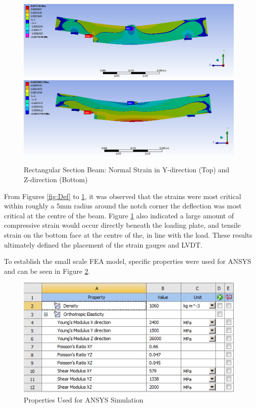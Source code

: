 \documentclass[11pt,a4paper]{article}
\numberwithin{equation}{subsection}
\begin{document}
\begin{figure}[h]
	\begin{center}
		\includegraphics[scale=0.45]{y_normal_strain}
		\includegraphics[scale=0.45]{z_normal_strain}
	\end{center}
	\caption{Rectangular Section Beam: Normal Strain in Y-direction (Top) and Z-direction (Bottom)}
	\label{fig:fig:y_norm}
\end{figure}

\noindent
From Figures \ref{fig:Def} to \ref{fig:fig:y_norm}, it was observed that the strains were most critical within roughly a 5mm radius around the notch corner the deflection was most critical at the centre of the beam. Figure \ref{fig:fig:y_norm} also indicated a large amount of compressive strain would occur directly beneath the loading plate, and tensile strain on the bottom face at the centre of the, in line with the load. These results ultimately defined the placement of the strain gauges and LVDT.

\pagebreak

\noindent
To establish the small scale FEA model, specific properties were used for ANSYS and can be seen in Figure \ref{fig:Properties}.
\vspace*{\baselineskip}
\begin{figure}[h]
	\begin{center}
		\includegraphics[scale=0.65]{Ansys_Properties}
	\end{center}
	\caption{Properties Used for ANSYS Simulation}
	\label{fig:Properties}
\end{figure}
\end{document}
